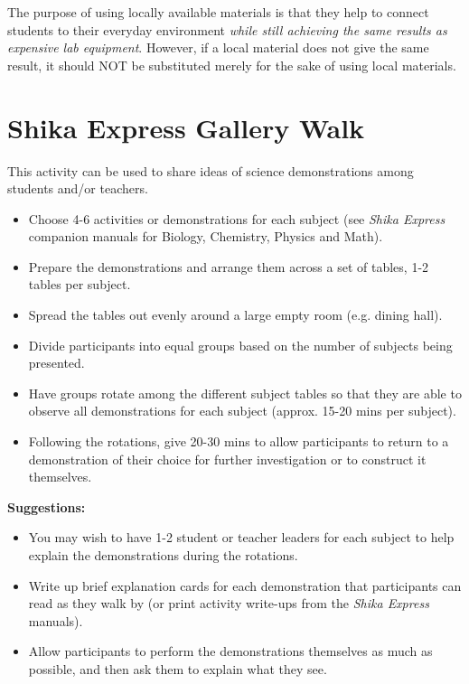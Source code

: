 The purpose of using locally available materials is that they help to connect students to their everyday environment \emph{while still achieving the same results as expensive lab equipment}. However, if a local material does not give the same result, it should NOT be substituted merely for the sake of using local materials.

\section{Shika Express Gallery Walk} 
This activity can be used to share ideas of science demonstrations among students and/or teachers.

\begin{itemize}
\item Choose 4-6 activities or demonstrations for each subject (see \emph{Shika Express} companion manuals for Biology, Chemistry, Physics and Math).
\item Prepare the demonstrations and arrange them across a set of tables, 1-2 tables per subject.
\item Spread the tables out evenly around a large empty room (e.g. dining hall).
\item Divide participants into equal groups based on the number of subjects being presented.
\item Have groups rotate among the different subject tables so that they are able to observe all demonstrations for each subject (approx. 15-20 mins per subject).
\item Following the rotations, give 20-30 mins to allow participants to return to a demonstration of their choice for further investigation or to construct it themselves.
\end{itemize}

\textbf{Suggestions:}
\begin{itemize}
\item You may wish to have 1-2 student or teacher leaders for each subject to help explain the demonstrations during the rotations. 
\item Write up brief explanation cards for each demonstration that participants can read as they walk by (or print activity write-ups from the \emph{Shika Express} manuals). 
\item Allow participants to perform the demonstrations themselves as much as possible, and then ask them to explain what they see.
\end{itemize}

